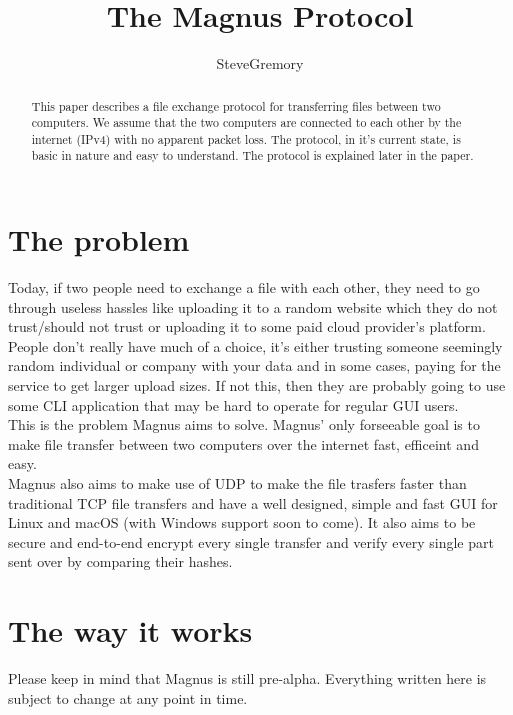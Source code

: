 \documentclass{article}
\title{The Magnus Protocol}
\author{SteveGremory}
\begin{document}
\maketitle

\begin{abstract}
This paper describes a file exchange protocol for transferring files between two computers.
We assume that the two computers are connected to each other by the internet (IPv4)
with no apparent packet loss. The protocol, in it's current state, is basic in nature
and easy to understand. The protocol is explained later in the paper.
\end{abstract}

\section{The problem}

Today, if two people need to exchange a file with each other, they
need to go through useless hassles like uploading it to a random website
which they do not trust/should not trust or uploading it to some paid cloud
provider's platform. \\


People don't really have much of a choice, it's either trusting
someone seemingly random individual or company with your data and in some
cases, paying for the service to get larger upload sizes. If not this, then they
are probably going to use some CLI application that may be hard to operate for
regular GUI users. \\


This is the problem Magnus aims to solve. Magnus' only forseeable goal is to make
file transfer between two computers over the internet fast, efficeint and easy. \\


Magnus also aims to make use of UDP to make the file trasfers faster than
traditional TCP file transfers and have a well designed, simple and fast GUI
for Linux and macOS (with Windows support soon to come). It also aims to be
secure and end-to-end encrypt every single transfer and verify every single
part sent over by comparing their hashes. \\

\section{The way it works}

Please keep in mind that Magnus is still pre-alpha.
Everything written here is subject to change at any point in time. \\
\end{document}
